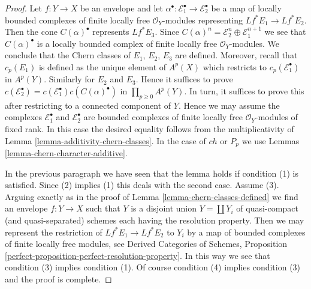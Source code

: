 \begin{proof}
Let $f : Y \to X$ be an envelope and let
$\alpha^\bullet : \mathcal{E}_1^\bullet \to \mathcal{E}_2^\bullet$
be a map of locally bounded complexes of finite locally free
$\mathcal{O}_Y$-modules representing $Lf^*E_1 \to Lf^*E_2$.
Then the cone $C(\alpha)^\bullet$ represents $Lf^*E_3$. Since
$C(\alpha)^n = \mathcal{E}_2^n \oplus \mathcal{E}_1^{n + 1}$
we see that $C(\alpha)^\bullet$ is a locally bounded complex
of finite locally free $\mathcal{O}_Y$-modules.
We conclude that the Chern classes of $E_1$, $E_2$, $E_3$
are defined. Moreover, recall that $c_p(E_1)$ is defined
as the unique element of $A^p(X)$ which restricts to
$c_p(\mathcal{E}_1^\bullet)$ in $A^p(Y)$. Similarly for
$E_2$ and $E_3$. Hence it suffices
to prove $c(\mathcal{E}_2^\bullet) =
c(\mathcal{E}_1^\bullet) c(C(\alpha)^\bullet)$
in $\prod_{p \geq 0} A^p(Y)$.
In turn, it suffices to prove this after restricting
to a connected component of $Y$. Hence we may assume
the complexes $\mathcal{E}_1^\bullet$ and $\mathcal{E}_2^\bullet$
are bounded complexes of finite locally free $\mathcal{O}_Y$-modules
of fixed rank. In this case the desired equality follows from the
multiplicativity of Lemma \ref{lemma-additivity-chern-classes}.
In the case of $ch$ or $P_p$ we use
Lemmas \ref{lemma-chern-character-additive}.

\medskip\noindent
In the previous paragraph we have seen that the lemma holds if
condition (1) is satisfied. Since (2) implies (1) this deals with
the second case. Assume (3). Arguing exactly as in the proof of
Lemma \ref{lemma-chern-classes-defined} we find an envelope
$f : Y \to X$ such that $Y$ is a disjoint union $Y = \coprod Y_i$
of quasi-compact (and quasi-separated) schemes each having the
resolution property. Then we may represent the restriction of
$Lf^*E_1 \to Lf^*E_2$ to $Y_i$ by a map of bounded complexes
of finite locally free modules, see
Derived Categories of Schemes, Proposition
\ref{perfect-proposition-perfect-resolution-property}.
In this way we see that condition (3) implies condition (1).
Of course condition (4) implies condition (3) and the proof
is complete.
\end{proof}

